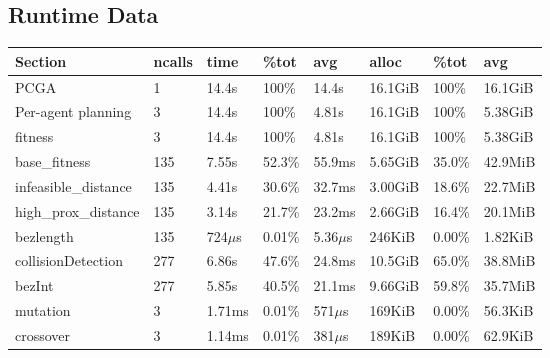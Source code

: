 \begin{appendices}

  \chapter{Runtime Data}
  \begin{table}
    \begin{tabular}{l l l l l l l l}
       Section                       &ncalls     &time   &\%tot     &avg     &alloc   &\%tot      &avg\\
\hline
PCGA                        &   1  &  14.4s &  100\% &  14.4s   &16.1GiB  &100\%   &16.1GiB\\
  \hspace{6pt} Per-agent planning &   3  &  14.4s &  100\% &  4.81s   &16.1GiB  &100\%   &5.38GiB\\
     \hspace{12pt}fitness                     &   3  &  14.4s &  100\% &  4.81s   &16.1GiB  &100\%   &5.38GiB\\
       \hspace{24pt}base\_fitness              & 135  &  7.55s & 52.3\% & 55.9ms   &5.65GiB  &35.0\%  &42.9MiB\\
         \hspace{30pt}infeasible\_distance     & 135  &  4.41s & 30.6\% & 32.7ms   &3.00GiB  &18.6\%  &22.7MiB\\
         \hspace{30pt}high\_prox\_distance      & 135  &  3.14s & 21.7\% & 23.2ms   &2.66GiB  &16.4\%  &20.1MiB\\
         \hspace{30pt}bezlength               & 135  &  724\(\mu\)s & 0.01\% & 5.36\(\mu\)s   & 246KiB  &0.00\%  &1.82KiB\\
       \hspace{24pt}collisionDetection        & 277  &  6.86s & 47.6\% & 24.8ms   &10.5GiB  &65.0\%  &38.8MiB\\
         \hspace{30pt}bezInt                  & 277  &  5.85s & 40.5\% & 21.1ms   &9.66GiB  &59.8\%  &35.7MiB\\
     \hspace{12pt}mutation                    &   3  & 1.71ms & 0.01\% &  571\(\mu\)s   & 169KiB  &0.00\%  &56.3KiB\\
     \hspace{12pt}crossover                   &   3  & 1.14ms & 0.01\% &  381\(\mu\)s   & 189KiB  &0.00\%  &62.9KiB\\

\end{tabular}
\end{table}
\end{appendices}
